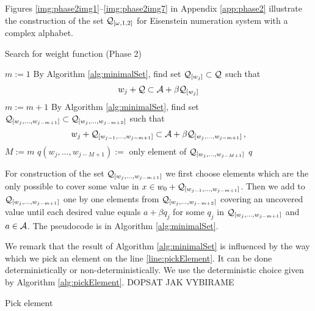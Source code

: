  Figures \ref{img:phase2img1}--\ref{img:phase2img7} in Appendix \ref{app:phase2} illustrate the construction of the set $\mathcal{Q}_{[\omega,1,2]}$ for Eisenstein numeration system with a complex alphabet.   
    
\begin{algorithm}
  \caption{Search for weight function (Phase 2)}
    \label{alg:weightFunction}
  \begin{algorithmic}[1]
    \STATE $m:=1$
        \STATE By Algorithm \ref{alg:minimalSet}, find set $\mathcal{Q}_{[w_j]} \subset \mathcal{Q}$ such that
          $$
          w_j + \mathcal{Q} \subset \mathcal{A} + \beta \mathcal{Q}_{[w_j]}
          $$
    \ENDFOR
        \STATE $m:= m +1$
            \STATE By Algorithm \ref{alg:minimalSet}, find set $\mathcal{Q}_{[w_j,\dots, w_{j-m+1}]} \subset \mathcal{Q}_{[w_j,\dots, w_{j-m+2}]}$ such that
              $$
              w_j + \mathcal{Q}_{[w_{j-1},\dots, w_{j-m+1}]} \subset \mathcal{A} + \beta \mathcal{Q}_{[w_j,\dots, w_{j-m+1}]}\,,
              $$
        \ENDFOR  
    \ENDWHILE  
    \STATE $M:= m$ 
        \STATE $q(w_j,\dots, w_{j-M+1}):=$ only element of $\mathcal{Q}_{[w_j,\dots, w_{j-M+1}]}$
    \ENDFOR
    \RETURN $q$
  \end{algorithmic}
\end{algorithm}
    
For construction of the set $\mathcal{Q}_{[w_j,\dots, w_{j-m+1}]}$ we first choose elements which are the only possible to cover some value in $x \in w_0 + \mathcal{Q}_{[w_{j-1},\dots, w_{j-m+1}]}$. Then we add to $\mathcal{Q}_{[w_j,\dots, w_{j-m+1}]}$ one by one elements from $\mathcal{Q}_{[w_j,\dots, w_{j-m+2}]}$ covering an uncovered value until each desired value equals $a+\beta q_j$ for some $q_j$ in $\mathcal{Q}_{[w_j,\dots, w_{j-m+1}]}$ and $a\in\mathcal{A}$. The pseudocode is in Algorithm \ref{alg:minimalSet}. 

We remark that the result of Algorithm \ref{alg:minimalSet} is influenced by the way which we pick an element on the line \ref{line:pickElement}. It can be done deterministically or non-deterministically. We use the deterministic choice given by Algorithm \ref{alg:pickElement}. DOPSAT JAK VYBIRAME
\begin{algorithm}
  \caption{Pick element}
    \label{alg:pickElement}
  \begin{algorithmic}[1]
    \REQUIRE{}
 
  \end{algorithmic}
\end{algorithm}

